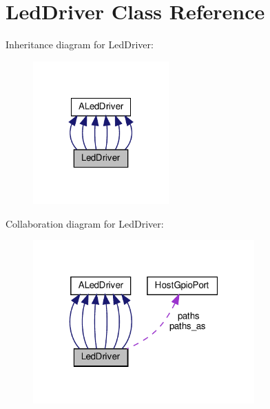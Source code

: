 \hypertarget{classLedDriver}{}\section{Led\+Driver Class Reference}
\label{classLedDriver}


Inheritance diagram for Led\+Driver\+:
\nopagebreak
\begin{figure}[H]
\begin{center}
\leavevmode
\includegraphics[width=148pt]{classLedDriver__inherit__graph}
\end{center}
\end{figure}


Collaboration diagram for Led\+Driver\+:
\nopagebreak
\begin{figure}[H]
\begin{center}
\leavevmode
\includegraphics[width=241pt]{classLedDriver__coll__graph}
\end{center}
\end{figure}
